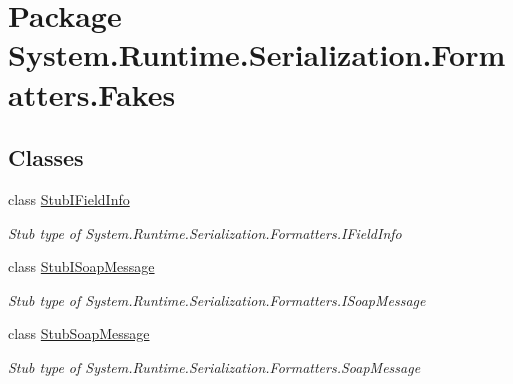 \hypertarget{namespace_system_1_1_runtime_1_1_serialization_1_1_formatters_1_1_fakes}{\section{Package System.\-Runtime.\-Serialization.\-Formatters.\-Fakes}
\label{namespace_system_1_1_runtime_1_1_serialization_1_1_formatters_1_1_fakes}
}
\subsection*{Classes}
\begin{DoxyCompactItemize}
\item 
class \hyperlink{class_system_1_1_runtime_1_1_serialization_1_1_formatters_1_1_fakes_1_1_stub_i_field_info}{Stub\-I\-Field\-Info}
\begin{DoxyCompactList}\small\item\em Stub type of System.\-Runtime.\-Serialization.\-Formatters.\-I\-Field\-Info\end{DoxyCompactList}\item 
class \hyperlink{class_system_1_1_runtime_1_1_serialization_1_1_formatters_1_1_fakes_1_1_stub_i_soap_message}{Stub\-I\-Soap\-Message}
\begin{DoxyCompactList}\small\item\em Stub type of System.\-Runtime.\-Serialization.\-Formatters.\-I\-Soap\-Message\end{DoxyCompactList}\item 
class \hyperlink{class_system_1_1_runtime_1_1_serialization_1_1_formatters_1_1_fakes_1_1_stub_soap_message}{Stub\-Soap\-Message}
\begin{DoxyCompactList}\small\item\em Stub type of System.\-Runtime.\-Serialization.\-Formatters.\-Soap\-Message\end{DoxyCompactList}\end{DoxyCompactItemize}
